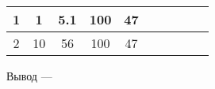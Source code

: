 \begin{table}[h]
\begin{tabular}{|c|cc|cc|c|cc|cc|}
1                  & \multicolumn{1}{c|}{1}                                                    & 5.1                                                  & \multicolumn{1}{c|}{100}                                                  & 47                                                   &                                                                              & \multicolumn{1}{c|}{}                                                                &                                                                    & \multicolumn{1}{c|}{}                                                                &                                                                    \\ \hline
2                  & \multicolumn{1}{c|}{10}                                                   & 56                                                   & \multicolumn{1}{c|}{100}                                                  & 47                                                   &                                                                              & \multicolumn{1}{c|}{}                                                                &                                                                    & \multicolumn{1}{c|}{}                                                                &                                                                    \\ \hline
\end{tabular}
\end{table}

Вывод --- \hrulefill

\hrulefill

\hrulefill